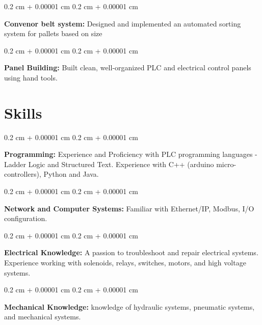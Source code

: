 \documentclass[10pt, letterpaper]{article}
\newenvironment{onecolentry}{
    \begin{adjustwidth}{
        0.2 cm + 0.00001 cm
    }{
        0.2 cm + 0.00001 cm
    }
}{
    \end{adjustwidth}
} %
\begin{document}
        \vspace{0.2 cm}

        \begin{onecolentry}
            \textbf{Convenor belt system:} Designed and implemented an automated sorting system for pallets based on size
        \end{onecolentry}

        \vspace{0.2 cm}

        \begin{onecolentry}
            \textbf{Panel Building:} Built clean, well-organized PLC and electrical control panels using hand tools.
        \end{onecolentry}


    
    \section{Skills}



        
        \begin{onecolentry}
            \textbf{Programming:} Experience and Proficiency with PLC programming languages - Ladder Logic and Structured Text. Experience with C++ (arduino micro-controllers), Python and Java.
        \end{onecolentry}

        \vspace{0.2 cm}

        \begin{onecolentry}
            \textbf{Network and Computer Systems:} Familiar with Ethernet/IP, Modbus, I/O configuration.
        \end{onecolentry}

        \vspace{0.2 cm}

        \begin{onecolentry}
            \textbf{Electrical Knowledge:} A passion to troubleshoot and repair electrical systems. Experience working with solenoids, relays, switches, motors, and high voltage systems.
        \end{onecolentry}

        \vspace{0.2 cm}

        \begin{onecolentry}
            \textbf{Mechanical Knowledge:} knowledge of hydraulic systems, pneumatic systems, and mechanical systems.
        \end{onecolentry}
\end{document}
